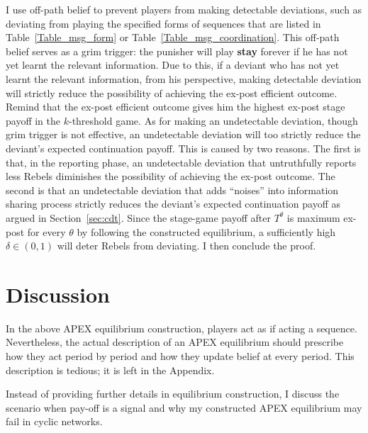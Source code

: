 \documentclass[12pt,letter]{article}
\theoremstyle{definition}
\theoremstyle{definition}
\theoremstyle{remark}
\theoremstyle{claim}
\begin{document}
I use off-path belief to prevent players from making detectable deviations, such as deviating from playing the specified forms of sequences that are listed in Table~\ref{Table_msg_form} or Table~\ref{Table_msg_coordination}. This off-path belief serves as a grim trigger: the punisher will play \textbf{stay} forever if he has not yet learnt the relevant information. Due to this, if a deviant who has not yet learnt the relevant information, from his perspective, making detectable deviation will strictly reduce the possibility of achieving the ex-post efficient outcome. Remind that the ex-post efficient outcome gives him the highest ex-post stage payoff in the $k$-threshold game. As for making an undetectable deviation, though grim trigger is not effective, an undetectable deviation will too strictly reduce the deviant's expected continuation payoff. This is caused by two reasons. The first is that, in the reporting phase, an undetectable deviation that untruthfully reports less Rebels diminishes the possibility of achieving the ex-post outcome. The second is that an undetectable deviation that adds ``noises'' into information sharing process strictly reduces the deviant's expected continuation payoff as argued in Section~\ref{sec:cdt}. Since the stage-game payoff after $T^{\theta}$ is maximum ex-post for every $\theta$ by following the constructed equilibrium, a sufficiently high $\delta\in(0,1)$ will deter Rebels from deviating. I then conclude the proof.

\section{Discussion}
\label{sec:varies}
%
%
In the above APEX equilibrium construction, players act as if acting a sequence. Nevertheless, the actual description of an APEX equilibrium should prescribe how they act period by period and how they update belief at every period. This description is tedious; it is left in the Appendix.

Instead of providing further details in equilibrium construction, I discuss the scenario when pay-off is a signal and why my constructed APEX equilibrium may fail in cyclic networks.
\end{document}
